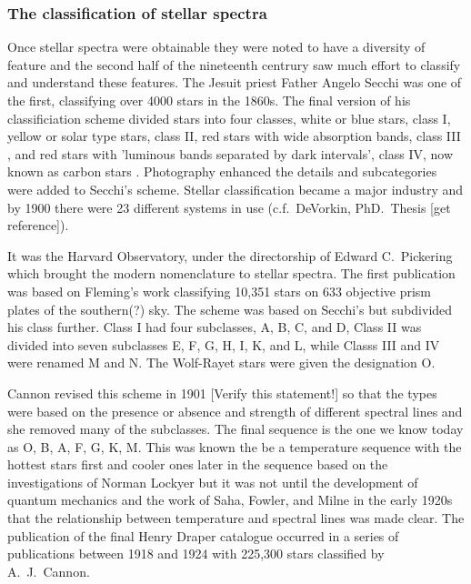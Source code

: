 \subsubsection{The classification of stellar spectra}

Once stellar spectra were obtainable  they were
noted to have a diversity of feature and the second half of the
nineteenth centrury saw much effort to classify and understand these
features.  The Jesuit priest Father Angelo Secchi was one of the
first, classifying over 4000 stars in the 1860s.  The final version of
his classificiation scheme  divided stars into four
classes, white or blue stars, class I, yellow or solar type stars,
class II, red stars with wide absorption bands, class III
\cite{Secchi1863}, and red stars with 'luminous bands separated by
dark intervals', class IV, now known as carbon stars
\cite{Secchi1868}. Photography enhanced the details and
subcategories were added to Secchi's scheme.  Stellar classification
became a major industry and by 1900 there were 23 different systems in
use (c.f.\ DeVorkin, PhD.~Thesis [get reference]).

It was the Harvard Observatory, under the directorship of Edward C.\
Pickering which brought the modern nomenclature to stellar spectra.
The first publication \cite{Pickering1890} was based on Fleming's
work classifying 10,351 stars on 633 objective prism plates of the
southern(?) sky. The scheme was based on Secchi's but subdivided his
class further. Class I had four subclasses, A, B, C, and D, Class II
was divided into seven subclasses E, F, G, H, I, K, and L, while
Classs III and IV were renamed M and N.  The Wolf-Rayet stars were
given the designation O.

Cannon  revised this scheme in 1901
\cite{Cannon1901} [Verify this statement!] so that the types were
based on the presence or absence and strength of different spectral
lines and she removed many of the subclasses.  The final sequence is
the one we know today as O, B, A, F, G, K, M. This was known the be a
temperature sequence with the hottest stars first and cooler ones
later in the sequence based on the investigations of Norman Lockyer
but it was not until the development of quantum mechanics and the work
of Saha, Fowler, and Milne in the early 1920s that the relationship
between temperature and spectral lines was made clear. The
publication  of the final Henry Draper catalogue
occurred in a series of publications between 1918 and 1924
\cite{Cannon1918a, Cannon1918b, Cannon1919a, Cannon1919b, Cannon1920,
Cannon1921, Cannon1922, Cannon1923, Cannon1924} with 225,300 stars
classified by A.\ J.\ Cannon.

